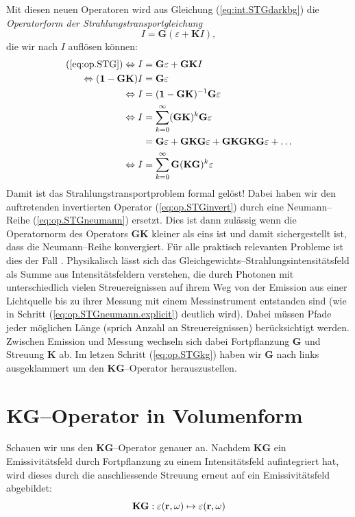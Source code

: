 	Mit diesen neuen Operatoren wird aus Gleichung (\ref{eq:int.STGdarkbg}) die {\em Operatorform der Strahlungstransportgleichung}
	\begin{equation}
		I=\mathbf{G}(\varepsilon + \mathbf{K}I),
		\label{eq:op.STG}
	\end{equation}
	die wir nach $I$ auflösen können:
	\begin{align}
		(\ref{eq:op.STG}) \Leftrightarrow I&=\mathbf{G}\varepsilon + \mathbf{GK}I \nonumber \\
		\Leftrightarrow (\mathbf{1}-\mathbf{GK})I &= \mathbf{G}\varepsilon \nonumber \\
		\Leftrightarrow I &= (\mathbf{1}-\mathbf{GK})^{-1}\mathbf{G}\varepsilon \label{eq:op.STGinvert} \\
		\Leftrightarrow I &= \sum_{k=0}^\infty (\mathbf{GK})^k \mathbf{G}\varepsilon \label{eq:op.STGneumann} \\
		&=\mathbf{G}\varepsilon + \mathbf{GKG}\varepsilon + \mathbf{GKGKG}\varepsilon + \hdots \label{eq:op.STGneumann.explicit} \\
		\Leftrightarrow I &=\sum_{k=0}^\infty \mathbf{G} (\mathbf{KG})^k \varepsilon \label{eq:op.STGkg}
	\end{align}
	Damit ist das Strahlungstransportproblem formal gelöst! Dabei haben wir den auftretenden invertierten Operator (\ref{eq:op.STGinvert}) durch eine Neumann--Reihe (\ref{eq:op.STGneumann}) ersetzt. Dies ist dann zulässig wenn die Operatornorm des Operators $\mathbf{GK}$ kleiner als eins ist und damit sichergestellt ist, dass die Neumann--Reihe konvergiert. Für alle praktisch relevanten Probleme ist dies der Fall \citep[s.][Theorem 12 und 13]{Arvo:1995p9257}. Physikalisch lässt sich das Gleichgewichts--Strahlungsintensitätsfeld als Summe aus Intensitätsfeldern verstehen, die durch Photonen mit unterschiedlich vielen Streuereignissen auf ihrem Weg von der Emission aus einer Lichtquelle bis zu ihrer Messung mit einem Messinstrument entstanden sind (wie in Schritt (\ref{eq:op.STGneumann.explicit}) deutlich wird). Dabei müssen Pfade jeder möglichen Länge (sprich Anzahl an Streuereignissen) berücksichtigt werden. Zwischen Emission und Messung wechseln sich dabei Fortpflanzung $\mathbf{G}$ und Streuung $\mathbf{K}$ ab. Im letzen Schritt (\ref{eq:op.STGkg}) haben wir $\mathbf{G}$ nach links ausgeklammert um den $\mathbf{KG}$--Operator herauszustellen.
	
	
	\section{KG--Operator in Volumenform}
	Schauen wir uns den $\mathbf{KG}$--Operator genauer an. Nachdem $\mathbf{KG}$ ein Emissivitätsfeld durch Fortpflanzung zu einem Intensitätsfeld aufintegriert hat, wird dieses durch die anschliessende Streuung erneut auf ein Emissivitätsfeld abgebildet:
	\begin{equation*}
		\mathbf{KG} : \varepsilon(\mathbf{r},\omega) \mapsto \varepsilon(\mathbf{r},\omega)
	\end{equation*}

